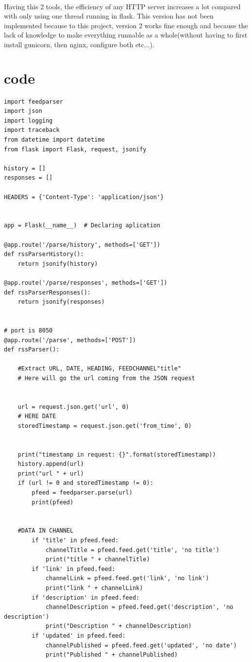 \documentclass{article}
\begin{document}
\paragraph{}
Having this 2 tools, the efficiency of any HTTP server increases a lot compared with only using one thread running in flask. This version has not been implemented because to this project, version 2 works fine enough and because the lack of knowledge to make everything runnable as a whole(without having to first install gunicorn, then nginx, configure both etc...).

\section{code}
\begin{lstlisting}
import feedparser
import json
import logging
import traceback
from datetime import datetime
from flask import Flask, request, jsonify

history = []
responses = []

HEADERS = {'Content-Type': 'application/json'}


app = Flask(__name__)  # Declaring aplication

@app.route('/parse/history', methods=['GET'])
def rssParserHistory():
    return jsonify(history)

@app.route('/parse/responses', methods=['GET'])
def rssParserResponses():
    return jsonify(responses)


# port is 8050
@app.route('/parse', methods=['POST'])
def rssParser():

    #Extract URL, DATE, HEADING, FEEDCHANNEL"title"
    # Here will go the url coming from the JSON request


    url = request.json.get('url', 0)
    # HERE DATE
    storedTimestamp = request.json.get('from_time', 0)


    print("timestamp in request: {}".format(storedTimestamp))
    history.append(url)
    print("url " + url)
    if (url != 0 and storedTimestamp != 0):
        pfeed = feedparser.parse(url)
        print(pfeed)


    #DATA IN CHANNEL
        if 'title' in pfeed.feed:
            channelTitle = pfeed.feed.get('title', 'no title')
            print("title " + channelTitle)
        if 'link' in pfeed.feed:
            channelLink = pfeed.feed.get('link', 'no link')
            print("link " + channelLink)
        if 'description' in pfeed.feed:
            channelDescription = pfeed.feed.get('description', 'no description')
            print("Description " + channelDescription)
        if 'updated' in pfeed.feed:
            channelPublished = pfeed.feed.get('updated', 'no date')
            print("Published " + channelPublished)


\end{lstlisting}
\end{document}
